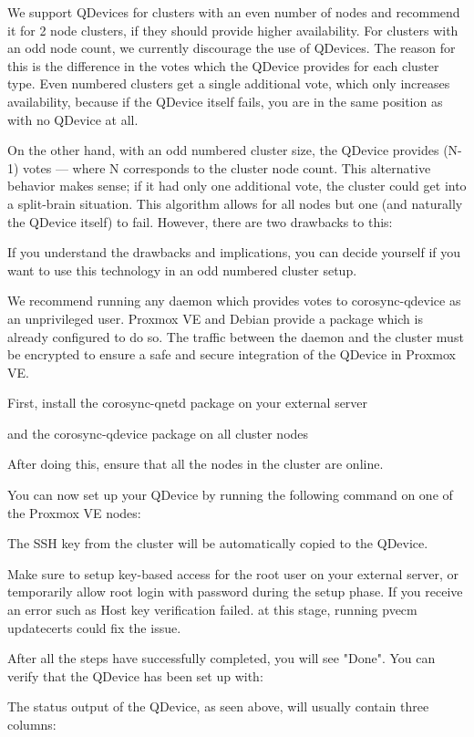 We support QDevices for clusters with an even number of nodes and recommend it for 2 node clusters, if they should provide higher availability. For clusters with an odd node count, we currently discourage the use of QDevices. The reason for this is the difference in the votes which the QDevice provides for each cluster type. Even numbered clusters get a single additional vote, which only increases availability, because if the QDevice itself fails, you are in the same position as with no QDevice at all.

On the other hand, with an odd numbered cluster size, the QDevice provides (N-1) votes — where N corresponds to the cluster node count. This alternative behavior makes sense; if it had only one additional vote, the cluster could get into a split-brain situation. This algorithm allows for all nodes but one (and naturally the QDevice itself) to fail. However, there are two drawbacks to this:

If you understand the drawbacks and implications, you can decide yourself if you want to use this technology in an odd numbered cluster setup.

We recommend running any daemon which provides votes to corosync-qdevice as an unprivileged user. Proxmox VE and Debian provide a package which is already configured to do so. The traffic between the daemon and the cluster must be encrypted to ensure a safe and secure integration of the QDevice in Proxmox VE.

First, install the corosync-qnetd package on your external server

and the corosync-qdevice package on all cluster nodes

After doing this, ensure that all the nodes in the cluster are online.

You can now set up your QDevice by running the following command on one of the Proxmox VE nodes:

The SSH key from the cluster will be automatically copied to the QDevice.

Make sure to setup key-based access for the root user on your external server, or temporarily allow root login with password during the setup phase. If you receive an error such as Host key verification failed. at this stage, running pvecm updatecerts could fix the issue.

After all the steps have successfully completed, you will see "Done". You can verify that the QDevice has been set up with:

The status output of the QDevice, as seen above, will usually contain three columns:

